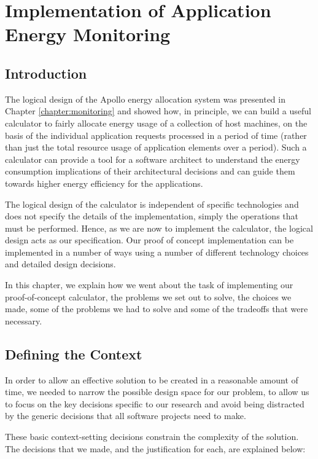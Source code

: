 \chapter{Implementation of Application Energy Monitoring}
\label{chapter:implementation}

\section{Introduction}
The logical design of the Apollo energy allocation system was presented in Chapter \ref{chapter:monitoring} and showed how, in principle, we can build a useful calculator to fairly allocate energy usage of a collection of host machines, on the basis of the individual application requests processed in a period of time (rather than just the total resource usage of application elements over a period).   Such a calculator can provide a tool for a software architect to understand the energy consumption implications of their architectural decisions and can guide them towards higher energy efficiency for the applications.

The logical design of the calculator is independent of specific technologies and does not specify the details of the implementation, simply the operations that must be performed.  Hence, as we are now to implement the calculator, the logical design acts as our specification.  Our proof of concept implementation can be implemented in a number of ways using a number of different technology choices and detailed design decisions.

In this chapter, we explain how we went about the task of implementing our proof-of-concept calculator, the problems we set out to solve, the choices we made, some of the problems we had to solve and some of the tradeoffs that were necessary.

\section{Defining the Context}

In order to allow an effective solution to be created in a reasonable amount of time, we needed to narrow the possible design space for our problem, to allow us to focus on the key decisions specific to our research and avoid being distracted by the generic decisions that all software projects need to make.

These basic context-setting decisions constrain the complexity of the solution.  The decisions that we made, and the justification for each, are explained below:

